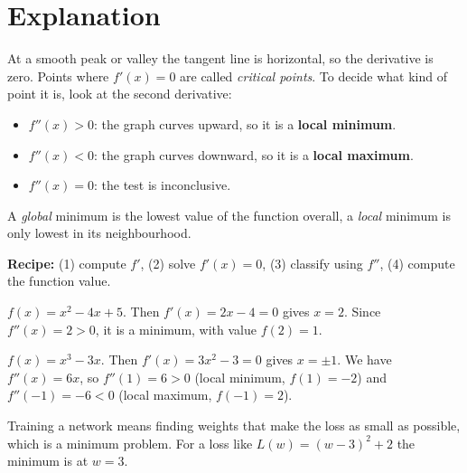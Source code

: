 \label{ch:minmax}

\section*{Explanation}
At a smooth peak or valley the tangent line is horizontal, so the derivative is zero. Points where $f'(x)=0$ are called \emph{critical points}. To decide what kind of point it is, look at the second derivative:
\begin{itemize}
  \item $f''(x)>0$: the graph curves upward, so it is a \textbf{local minimum}.
  \item $f''(x)<0$: the graph curves downward, so it is a \textbf{local maximum}.
  \item $f''(x)=0$: the test is inconclusive.
\end{itemize}
A \emph{global} minimum is the lowest value of the function overall, a \emph{local} minimum is only lowest in its neighbourhood.

\textbf{Recipe:} (1) compute $f'$, (2) solve $f'(x)=0$, (3) classify using $f''$, (4) compute the function value.

\begin{example}
$f(x)=x^2-4x+5$. Then $f'(x)=2x-4=0$ gives $x=2$. Since $f''(x)=2>0$, it is a minimum, with value $f(2)=1$.
\end{example}

\begin{example}
$f(x)=x^3-3x$. Then $f'(x)=3x^2-3=0$ gives $x=\pm1$. We have $f''(x)=6x$, so $f''(1)=6>0$ (local minimum, $f(1)=-2$) and $f''(-1)=-6<0$ (local maximum, $f(-1)=2$).
\end{example}

\begin{aibox}
Training a network means finding weights that make the loss as small as possible, which is a minimum problem. For a loss like $L(w)=(w-3)^2+2$ the minimum is at $w=3$.
\end{aibox}

